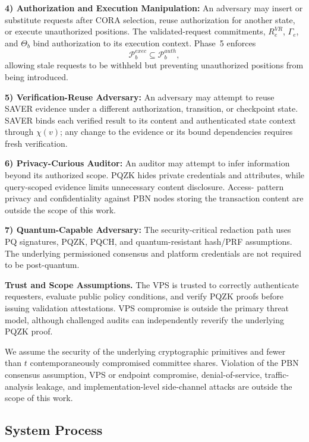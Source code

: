 \documentclass[lettersize,journal]{IEEEtran}
\begin{document}
\textbf{4) Authorization and Execution Manipulation:}
An adversary may insert or substitute requests after CORA selection,
reuse authorization for another state, or execute unauthorized
positions. The validated-request commitments, $R_e^{VR}$, $\Gamma_e$,
and $\Theta_b$ bind authorization to its execution context. Phase~5
enforces
\begin{equation}
\mathcal{P}_b^{exec}\subseteq\mathcal{P}_b^{auth},
\end{equation}
allowing stale requests to be withheld but preventing unauthorized
positions from being introduced.

\textbf{5) Verification-Reuse Adversary:}
An adversary may attempt to reuse SAVER evidence under a different
authorization, transition, or checkpoint state. SAVER binds each
verified result to its content and authenticated state context through
$\chi(v)$; any change to the evidence or its bound dependencies
requires fresh verification.

\textbf{6) Privacy-Curious Auditor:}
An auditor may attempt to infer information beyond its authorized
scope. PQZK hides private credentials and attributes, while
query-scoped evidence limits unnecessary content disclosure. Access-
pattern privacy and confidentiality against PBN nodes storing the
transaction content are outside the scope of this work.

\textbf{7) Quantum-Capable Adversary:}
The security-critical redaction path uses PQ signatures, PQZK, PQCH,
and quantum-resistant hash/PRF assumptions. The underlying permissioned
consensus and platform credentials are not required to be
post-quantum.

\medskip
\noindent\textbf{Trust and Scope Assumptions.}
The VPS is trusted to correctly authenticate requesters, evaluate
public policy conditions, and verify PQZK proofs before issuing
validation attestations. VPS compromise is outside the primary threat
model, although challenged audits can independently reverify the
underlying PQZK proof.

We assume the security of the underlying cryptographic primitives and
fewer than $t$ contemporaneously compromised committee shares.
Violation of the PBN consensus assumption, VPS or endpoint compromise,
denial-of-service, traffic-analysis leakage, and implementation-level
side-channel attacks are outside the scope of this work.
  \subsection{System Process}
\end{document}
